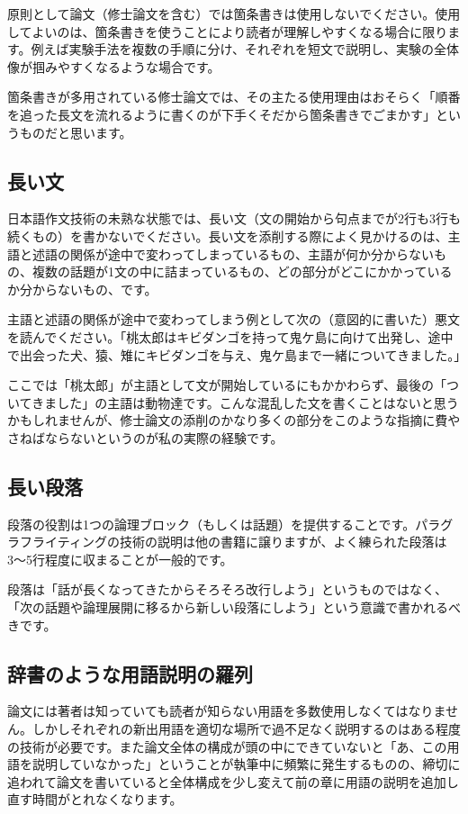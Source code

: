 原則として論文（修士論文を含む）では箇条書きは使用しないでください。使用してよいのは、箇条書きを使うことにより読者が理解しやすくなる場合に限ります。例えば実験手法を複数の手順に分け、それぞれを短文で説明し、実験の全体像が掴みやすくなるような場合です。

箇条書きが多用されている修士論文では、その主たる使用理由はおそらく「順番を追った長文を流れるように書くのが下手くそだから箇条書きでごまかす」というものだと思います。

\subsection{長い文}

日本語作文技術の未熟な状態では、長い文（文の開始から句点までが2行も3行も続くもの）を書かないでください。長い文を添削する際によく見かけるのは、主語と述語の関係が途中で変わってしまっているもの、主語が何か分からないもの、複数の話題が1文の中に詰まっているもの、どの部分がどこにかかっているか分からないもの、です。

主語と述語の関係が途中で変わってしまう例として次の（意図的に書いた）悪文を読んでください。「桃太郎はキビダンゴを持って鬼ケ島に向けて出発し、途中で出会った犬、猿、雉にキビダンゴを与え、鬼ケ島まで一緒についてきました。」

ここでは「桃太郎」が主語として文が開始しているにもかかわらず、最後の「ついてきました」の主語は動物達です。こんな混乱した文を書くことはないと思うかもしれませんが、修士論文の添削のかなり多くの部分をこのような指摘に費やさねばならないというのが私の実際の経験です。

\subsection{長い段落}

段落の役割は1つの論理ブロック（もしくは話題）を提供することです。パラグラフライティングの技術の説明は他の書籍に譲りますが、よく練られた段落は3〜5行程度に収まることが一般的です。

段落は「話が長くなってきたからそろそろ改行しよう」というものではなく、「次の話題や論理展開に移るから新しい段落にしよう」という意識で書かれるべきです。

\subsection{辞書のような用語説明の羅列}

論文には著者は知っていても読者が知らない用語を多数使用しなくてはなりません。しかしそれぞれの新出用語を適切な場所で過不足なく説明するのはある程度の技術が必要です。また論文全体の構成が頭の中にできていないと「あ、この用語を説明していなかった」ということが執筆中に頻繁に発生するものの、締切に追われて論文を書いていると全体構成を少し変えて前の章に用語の説明を追加し直す時間がとれなくなります。

